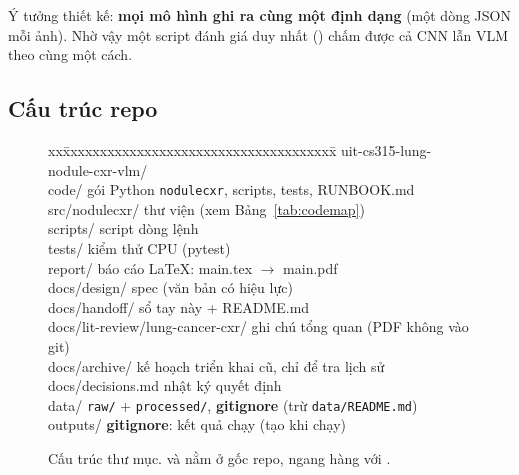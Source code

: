 Ý tưởng thiết kế: \textbf{mọi mô hình ghi ra cùng một định dạng} (một dòng JSON mỗi ảnh). Nhờ vậy một script đánh giá duy nhất
() chấm được cả CNN lẫn VLM theo cùng một cách.

\subsection{Cấu trúc repo}

\begin{figure}[H]
\centering
\begin{minipage}{0.92\textwidth}
\small\ttfamily
\begin{tabbing}
xx\=xxxxxxxxxxxxxxxxxxxxxxxxxxxxxxxxxxxxx\=\kill
uit-cs315-lung-nodule-cxr-vlm/\\
\>code/                       \>\rmfamily gói Python \texttt{nodulecxr}, scripts, tests, RUNBOOK.md\\
\>\quad src/nodulecxr/        \>\rmfamily thư viện (xem Bảng~\ref{tab:codemap})\\
\>\quad scripts/              \> script dòng lệnh\\
\>\quad tests/                \> kiểm thử CPU (pytest)\\
\>report/                     \>\rmfamily báo cáo LaTeX: main.tex $\rightarrow$ main.pdf\\
\>docs/design/                \>\rmfamily spec (văn bản có hiệu lực)\\
\>docs/handoff/               \>\rmfamily sổ tay này + README.md\\
\>docs/lit-review/lung-cancer-cxr/ \>\rmfamily ghi chú tổng quan (PDF không vào git)\\
\>docs/archive/               \>\rmfamily kế hoạch triển khai cũ, chỉ để tra lịch sử\\
\>docs/decisions.md           \>\rmfamily nhật ký quyết định\\
\>data/                       \>\rmfamily \texttt{raw/} + \texttt{processed/}, \textbf{gitignore} (trừ \texttt{data/README.md})\\
\>outputs/                    \>\rmfamily \textbf{gitignore}: kết quả chạy (tạo khi chạy)\\
\end{tabbing}
\end{minipage}
\caption{Cấu trúc thư mục.  và  nằm ở gốc repo, ngang hàng với .}
\label{fig:tree}
\end{figure}

